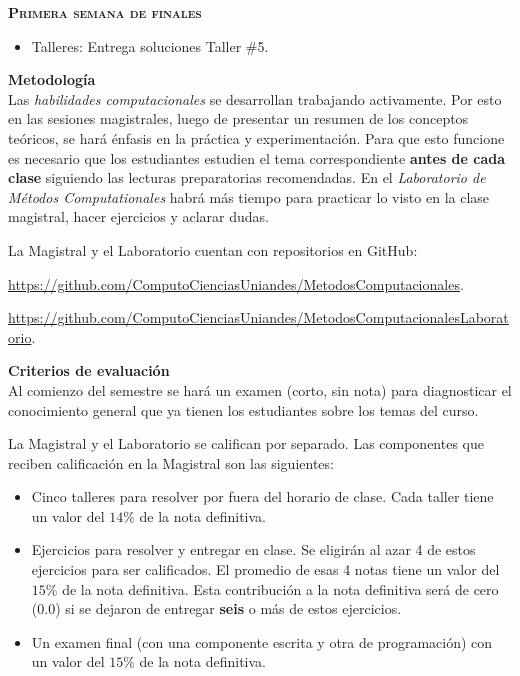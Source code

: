 \documentclass[letterpaper,10pt,onecolumn]{article}
\begin{document}
\noindent\textbf{\textsc{Primera semana de finales}}\\[-0.5cm]
\begin{itemize}
\item Talleres:
Entrega soluciones Taller \#5. 
\\[-0.6cm]
\end{itemize}

\noindent\textbf{\large {} \quad
  Metodolog\'ia}\\[-0.2cm] 


\noindent\normalsize 
Las \emph{habilidades computacionales} se desarrollan trabajando activamente. 
Por esto en las sesiones magistrales, luego de presentar un resumen de
los conceptos te\'oricos, se har\'a \'enfasis en la pr\'actica y
experimentaci\'on.   
Para que esto funcione es necesario que los estudiantes estudien el
tema correspondiente {\bf antes de cada clase} siguiendo las lecturas
preparatorias recomendadas. En el \emph{Laboratorio de M\'etodos
  Computationales} habr\'a m\'as tiempo para practicar lo visto en la
clase magistral, hacer ejercicios y aclarar dudas.   

La Magistral y el Laboratorio cuentan con repositorios  en GitHub:

\url{https://github.com/ComputoCienciasUniandes/MetodosComputacionales}. 

\url{https://github.com/ComputoCienciasUniandes/MetodosComputacionalesLaboratorio}. 


\noindent\textbf{\large {} \quad Criterios de
  evaluaci\'on}\\[-0.2cm] 

Al comienzo del semestre se har\'a un examen (corto, sin nota) para
diagnosticar el conocimiento general que ya tienen los estudiantes
sobre los temas del curso. 

La Magistral y el Laboratorio se califican por separado. Las
componentes que reciben calificaci\'on en la Magistral son las
siguientes:

\begin{itemize}
\item 
Cinco talleres para resolver por fuera del horario de clase. 
Cada taller tiene un valor del $14\%$ de la nota definitiva.  
\item 
Ejercicios para resolver y entregar en clase. 
Se eligir\'an al azar 4 de estos ejercicios para ser calificados. 
El promedio de esas 4 notas tiene un valor del $15\%$ de la nota
definitiva. 
Esta contribuci\'on a la nota definitiva ser\'a de cero (0.0) si se
dejaron de entregar {\bf seis} o m\'as de estos ejercicios. 
\item
Un examen final (con una componente escrita y otra de
programaci\'on) con un valor del $15\%$ de la nota definitiva.  
\end{itemize}
\end{document}
